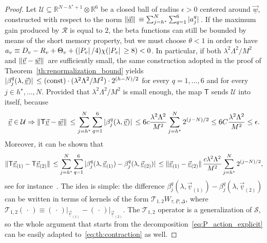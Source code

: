 \documentclass[a4paper, 11pt]{article}
\newcommand{\R}{\mathbb{R}}
\newcommand{\cutoff}{\Lambda}								%
\newcommand{\ren}{\mathcal{R}}								%
\theoremstyle{thm}
\begin{document}
\begin{proof}
Let $\mathcal{U} \subseteq \R^{N - h^\star + 1} \otimes \R^6$ be a closed ball of radius $\epsilon > 0$ centered around $\underline{\vec{w}}$, constructed with respect to the norm $\norm*{\underline{\vec{a}}} \equiv \sum_{j = h^\star}^N \sum_{q = 1}^6 \abs*{a_j^q}$. If the maximum gain produced by $\ren$ is equal to $2$, the beta functions can still be bounded by means of the short memory property, but we must choose $\theta < 1$ in order to have $a_v \equiv D_v - R_v + \Theta_v + (\abs*{P_v}/4) \chi(\abs*{P_v} \ge 8) < 0$. In particular, if both $\lambda^2 \cutoff^2/M^2$ and $\norm*{\underline{\vec{v}} - \underline{\vec{w}}}$ are sufficiently small, the same construction adopted in the proof of Theorem~\ref{th:renormalization_bound} yields $\abs*{\beta^q_j(\lambda, \underline{\vec{v}})} \le (\mathrm{const}) \cdot (\lambda^2 \cutoff^2/M^2) \cdot 2^{(h-N)/2}$ for every $q = 1, \dots, 6$ and for every $j \in h^\star, \dots, N$. Provided that $\lambda^2 \cutoff^2/M^2$ is small enough, the map $\mathsf{T}$ sends $\mathcal{U}$ into itself, because
\begin{equation}
\underline{\vec{v}} \in \mathcal{U} \Rightarrow \norm*{\mathsf{T} \underline{\vec{v}} - \underline{\vec{w}}} \le \sum_{j = h^\star}^N \sum_{q = 1}^6 \abs*{\beta^q_j(\lambda, \underline{\vec{v}})} \le 6c \frac{\lambda^2 \cutoff^2}{M^2} \sum_{j = h^\star}^N 2^{(j-N)/2} \le 6C \frac{\lambda^2 \cutoff^2}{M^2} \le \epsilon.
\end{equation}
Moreover, it can be shown that
\begin{equation}
\label{eq:th:contraction}
\norm*{\mathsf{T} \underline{\vec{v}}_{(1)} - \mathsf{T} \underline{\vec{v}}_{(2)}} \le \sum_{j = h^\star}^N \sum_{q = 1}^6 \abs*{\beta^q_j(\lambda, \underline{\vec{v}}_{(1)}) - \beta^q_j(\lambda, \underline{\vec{v}}_{(2)})} \le \norm*{\underline{\vec{v}}_{(1)} - \underline{\vec{v}}_{(2)}} \frac{c\lambda^2 \cutoff^2}{M^2} \sum_{j = h^\star}^N 2^{(j - N)/2},
\end{equation}
see for instance~\cite[Appendix A5]{Giuliani_2005}. The idea is simple: the difference $\beta^q_j(\lambda, \underline{\vec{v}}_{(1)}) - \beta^q_j(\lambda, \underline{\vec{v}}_{(2)})$ can be written in terms of kernels of the form $\mathscr{T}_{1, 2} W_{\tau, \underline{P}, \underline{\Delta}}$, where $\mathscr{T}_{1, 2} (\, \cdot \,) \equiv (\, \cdot \,) \vert_{\underline{\vec{v}}_{(1)}} - (\, \cdot \,)\vert_{\underline{\vec{v}}_{(2)}}$. The $\mathscr{T}_{1, 2}$ operator is a generalization of $\mathscr{S}$, so the whole argument that starts from the decomposition~\eqref{eq:P_action_explicit} can be easily adapted to~\eqref{eq:th:contraction} as well. 


\end{proof}
\end{document}
